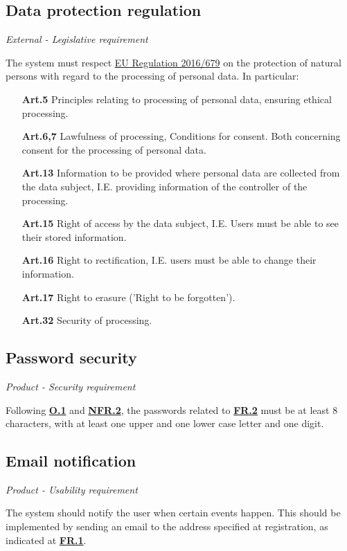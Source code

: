 \documentclass[12pt]{article}
\renewcommand\bf[1]{\textbf{#1}}
\renewcommand\it[1]{\textit{#1}}
\newcommand\hyl[1]{\hyperref[#1]{\bf{#1}}}
\begin{document}
\subsection{Data protection regulation} \label{NFR.2}
\it{External - Legislative requirement}

The system must respect \href{https://eur-lex.europa.eu/legal-content/EN/TXT/?uri=CELEX%3A02016R0679-20160504&qid=1532348683434}{EU Regulation 2016/679} 
on the protection of natural persons with regard to the processing of personal data.
In particular:
\begin{itemize}
	\item[\bf{Art.5}] Principles relating to processing of personal data, ensuring ethical processing.
	\item[\bf{Art.6,7}] Lawfulness of processing, Conditions for consent. Both concerning consent for the processing of personal data.
	\item[\bf{Art.13}] Information to be provided where personal data are collected from the data subject, I.E. providing information of the controller of the processing.
	\item[\bf{Art.15}] Right of access by the data subject, I.E. Users must be able to see their stored information.
	\item[\bf{Art.16}] Right to rectification, I.E. users must be able to change their information.
	\item[\bf{Art.17}] Right to erasure ('Right to be forgotten').
	\item[\bf{Art.32}] Security of processing.
\end{itemize}

\subsection{Password security} \label{NFR.3}
\it{Product - Security requirement}

Following \hyl{O.1} and \hyl{NFR.2}, the passwords related to \hyl{FR.2} must be at least 8 characters, with at least one upper and one lower case letter and one digit.

\subsection{Email notification} \label{NFR.4}
\it{Product - Usability requirement}

The system should notify the user when certain events happen. This should be implemented by sending an email to the address specified at registration, as indicated at \hyl{FR.1}.
\end{document}
